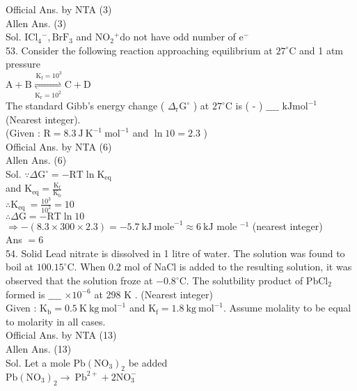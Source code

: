 \documentclass[10pt]{article}
\begin{document}
Official Ans. by NTA (3)\\
Allen Ans. (3)\\
Sol. \(\mathrm{ICl}_{4}{ }^{-}, \mathrm{BrF}_{3}\) and \(\mathrm{NO}_{2}{ }^{+}\)do not have odd number of \(\mathrm{e}^{-}\)\\
53. Consider the following reaction approaching equilibrium at \(27^{\circ} \mathrm{C}\) and 1 atm pressure\\
\(\mathrm{A}+\mathrm{B} \underset{\mathrm{K}_{\mathrm{r}}=10^{2}}{\stackrel{\mathrm{~K}_{\mathrm{f}}=10^{3}}{\rightleftharpoons}} \mathrm{C}+\mathrm{D}\)\\
The standard Gibb's energy change ( \(\Delta_{\mathrm{r}} \mathrm{G}^{\circ}\) ) at \(27^{\circ} \mathrm{C}\) is ( - ) \(\_\_\_\_\) \(\mathrm{kJ} \mathrm{mol}^{-1}\)\\
(Nearest integer).\\
(Given : \(\mathrm{R}=8.3 \mathrm{~J} \mathrm{~K}^{-1} \mathrm{~mol}^{-1}\) and \(\ln 10=2.3\) )\\
Official Ans. by NTA (6)\\
Allen Ans. (6)\\
Sol. \(\because \Delta \mathrm{G}^{\circ}=-\mathrm{RT} \ln \mathrm{K}_{\mathrm{eq}}\)\\
and \(\mathrm{K}_{\mathrm{eq}}=\frac{\mathrm{K}_{\mathrm{f}}}{\mathrm{K}_{\mathrm{b}}}\)\\
\(\therefore \mathrm{K}_{\text {eq }}=\frac{10^{3}}{10^{2}}=10\)\\
\(\therefore \Delta \mathrm{G}=-\mathrm{RT} \ln 10\)\\
\(\Rightarrow-(8.3 \times 300 \times 2.3)=-5.7 \mathrm{~kJ} \mathrm{~mole}^{-1} \approx 6 \mathrm{~kJ}\) mole \(^{-1}\) (nearest integer)\\
Ans \(=6\)\\
54. Solid Lead nitrate is dissolved in 1 litre of water. The solution was found to boil at \(100.15^{\circ} \mathrm{C}\). When 0.2 mol of NaCl is added to the resulting solution, it was observed that the solution froze at \(-0.8^{\circ} \mathrm{C}\). The solutbility product of \(\mathrm{PbCl}_{2}\) formed is \(\_\_\_\_\) \(\times 10^{-6}\) at 298 K . (Nearest integer)\\
Given : \(\mathrm{K}_{\mathrm{b}}=0.5 \mathrm{~K} \mathrm{~kg} \mathrm{~mol}^{-1}\) and \(\mathrm{K}_{\mathrm{f}}=1.8 \mathrm{~kg} \mathrm{~mol}^{-1}\). Assume molality to be equal to molarity in all cases.\\
Official Ans. by NTA (13)\\
Allen Ans. (13)\\
Sol. Let a mole \(\mathrm{Pb}\left(\mathrm{NO}_{3}\right)_{2}\) be added\\
\(\mathrm{Pb}\left(\mathrm{NO}_{3}\right)_{2} \rightarrow \mathrm{~Pb}^{2+}+2 \mathrm{NO}_{3}^{-}\)
\end{document}
